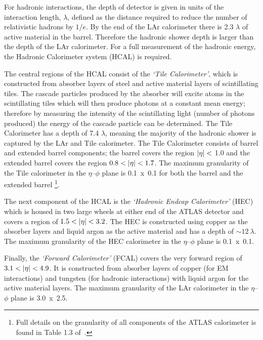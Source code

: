 For hadronic interactions, the depth of detector is given in units of the interaction length, $\lambda$,
defined as the distance required to reduce the number of relativistic hadrons by $1/e$.
By the end of the LAr calorimeter there is 2.3 $\lambda$ of active material in the barrel.
Therefore the hadronic shower depth is larger than the depth of the LAr calorimeter.
For a full measurement of the hadronic energy, the Hadronic Calorimeter system (HCAL) is required. 

The central regions of the HCAL consist of the \textit{`Tile Calorimeter'},
which is constructed from absorber layers of steel and active material layers of scintillating tiles.
The cascade particles produced by the absorber will excite atoms in the scintillating tiles which will then produce photons at a constant mean energy;
therefore by measuring the intensity of the scintillating light (number of photons produced) the energy of the cascade particle can be determined.
The Tile Calorimeter has a depth of 7.4 $\lambda$, meaning the majority of the hadronic shower is captured by the LAr and Tile calorimeter.
The Tile Calorimeter consists of barrel and extended barrel components;
the barrel covers the region $|\eta|\nobreak<$ 1.0 and the extended barrel covers the region $0.8\nobreak<\nobreak|\eta|\nobreak<\nobreak1.7$.
The maximum granularity of the Tile calorimeter in the $\eta$--$\phi$ plane
is 0.1~x~0.1 for both the barrel and the extended barrel \footnote{Full details on the granularity of all components of the ATLAS calorimeter is found in Table 1.3 of~\cite{det-ATLAS_Exp}.}. 

The next component of the HCAL is the \textit{`Hadronic Endcap Calorimeter'} (HEC)
which is housed in two large wheels at either end of the ATLAS detector
and covers a region of $1.5\nobreak<\nobreak|\eta|\nobreak<\nobreak3.2$.
The HEC is constructed using copper as the absorber layers and liquid argon as the active material
and has a depth of $\sim 12~\lambda$.
The maximum granularity of the HEC calorimeter in the $\eta$--$\phi$ plane is \mbox{0.1~x~0.1.}

Finally, the \textit{`Forward Calorimeter'} (FCAL) covers the very forward region of $3.1\nobreak<\nobreak|\eta|\nobreak<\nobreak4.9$.
It is constructed from absorber layers of
copper (for EM interactions) and tungsten (for hadronic interactions)
with liquid argon for the active material layers.
The maximum granularity of the LAr calorimeter in the $\eta$--$\phi$ plane is 3.0~x~2.5.

